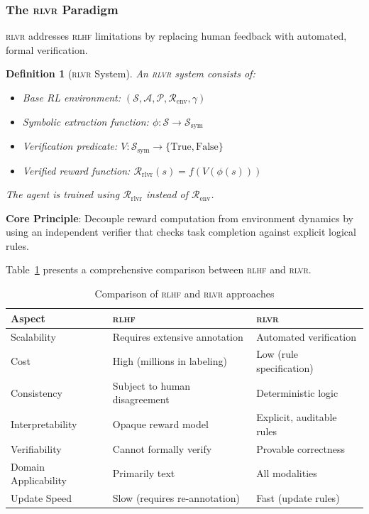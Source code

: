 \documentclass[11pt,a4paper]{article}
\newtheorem{definition}{Definition}
\newcommand{\rlvr}{\textsc{rlvr}}
\newcommand{\rlhf}{\textsc{rlhf}}
\begin{document}
\subsubsection{The \rlvr{} Paradigm}

\rlvr{} addresses \rlhf{} limitations by replacing human feedback with automated, formal verification.

\begin{definition}[\rlvr{} System]
\label{def:rlvr}
An \rlvr{} system consists of:
\begin{itemize}[leftmargin=*]
    \item Base RL environment: $(\mathcal{S}, \mathcal{A}, \mathcal{P}, \mathcal{R}_{\text{env}}, \gamma)$
    \item Symbolic extraction function: $\phi: \mathcal{S} \rightarrow \mathcal{S}_{\text{sym}}$
    \item Verification predicate: $V: \mathcal{S}_{\text{sym}} \rightarrow \{\text{True}, \text{False}\}$
    \item Verified reward function: $\mathcal{R}_{\text{rlvr}}(s) = f(V(\phi(s)))$
\end{itemize}
The agent is trained using $\mathcal{R}_{\text{rlvr}}$ instead of $\mathcal{R}_{\text{env}}$.
\end{definition}

\textbf{Core Principle}: Decouple reward computation from environment dynamics by using an independent verifier that checks task completion against explicit logical rules.

Table~\ref{tab:rlhf_vs_rlvr} presents a comprehensive comparison between \rlhf{} and \rlvr{}.

\begin{table}[t]
\centering
\caption{Comparison of \rlhf{} and \rlvr{} approaches}
\label{tab:rlhf_vs_rlvr}
\small
\begin{tabular}{@{}lll@{}}
\toprule
\textbf{Aspect} & \textbf{\rlhf{}} & \textbf{\rlvr{}} \\
\midrule
Scalability & Requires extensive annotation & Automated verification \\
Cost & High (millions in labeling) & Low (rule specification) \\
Consistency & Subject to human disagreement & Deterministic logic \\
Interpretability & Opaque reward model & Explicit, auditable rules \\
Verifiability & Cannot formally verify & Provable correctness \\
Domain Applicability & Primarily text & All modalities \\
Update Speed & Slow (requires re-annotation) & Fast (update rules) \\
\bottomrule
\end{tabular}
\end{table}
\end{document}
